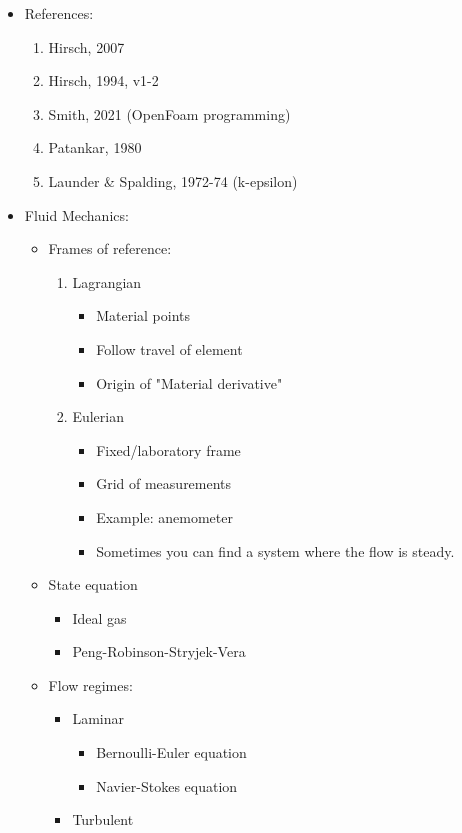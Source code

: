 \begin{itemize}
	\item References:
	\begin{enumerate}
		\item Hirsch, 2007
		\item Hirsch, 1994, v1-2
		\item Smith, 2021 (OpenFoam programming)
		\item Patankar, 1980
		\item Launder \& Spalding, 1972-74 (k-epsilon)
	\end{enumerate}
	\item Fluid Mechanics:
	\begin{itemize}
		\item Frames of reference:
		\begin{enumerate}
			\item Lagrangian
			\begin{itemize}
				\item Material points
				\item Follow travel of element
				\item Origin of "Material derivative"
			\end{itemize}
			\item Eulerian
			\begin{itemize}
				\item Fixed/laboratory frame
				\item Grid of measurements
				\item Example: anemometer
				\item Sometimes you can find a system where the flow is steady.
			\end{itemize}
		\end{enumerate}
		\item State equation
		\begin{itemize}
			\item Ideal gas
			\item Peng-Robinson-Stryjek-Vera
		\end{itemize}
		\item Flow regimes:
		\begin{itemize}
			\item Laminar
			\begin{itemize}
				\item Bernoulli-Euler equation
				\item Navier-Stokes equation
			\end{itemize}
			\item Turbulent

\end{itemize}
\end{itemize}
\end{itemize}
